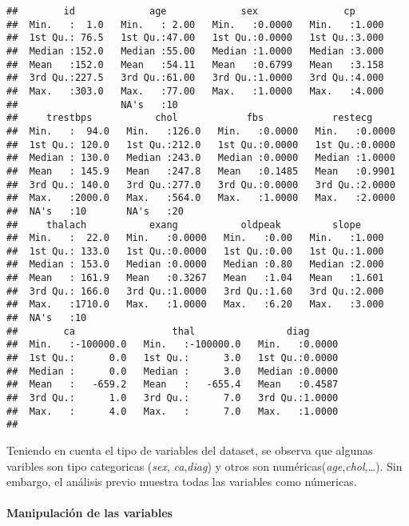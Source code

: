 \documentclass[
]{article}
\begin{document}
\begin{verbatim}
##        id             age             sex               cp       
##  Min.   :  1.0   Min.   : 2.00   Min.   :0.0000   Min.   :1.000  
##  1st Qu.: 76.5   1st Qu.:47.00   1st Qu.:0.0000   1st Qu.:3.000  
##  Median :152.0   Median :55.00   Median :1.0000   Median :3.000  
##  Mean   :152.0   Mean   :54.11   Mean   :0.6799   Mean   :3.158  
##  3rd Qu.:227.5   3rd Qu.:61.00   3rd Qu.:1.0000   3rd Qu.:4.000  
##  Max.   :303.0   Max.   :77.00   Max.   :1.0000   Max.   :4.000  
##                  NA's   :10                                      
##     trestbps           chol            fbs            restecg      
##  Min.   :  94.0   Min.   :126.0   Min.   :0.0000   Min.   :0.0000  
##  1st Qu.: 120.0   1st Qu.:212.0   1st Qu.:0.0000   1st Qu.:0.0000  
##  Median : 130.0   Median :243.0   Median :0.0000   Median :1.0000  
##  Mean   : 145.9   Mean   :247.8   Mean   :0.1485   Mean   :0.9901  
##  3rd Qu.: 140.0   3rd Qu.:277.0   3rd Qu.:0.0000   3rd Qu.:2.0000  
##  Max.   :2000.0   Max.   :564.0   Max.   :1.0000   Max.   :2.0000  
##  NA's   :10       NA's   :20                                       
##     thalach           exang           oldpeak         slope      
##  Min.   :  22.0   Min.   :0.0000   Min.   :0.00   Min.   :1.000  
##  1st Qu.: 133.0   1st Qu.:0.0000   1st Qu.:0.00   1st Qu.:1.000  
##  Median : 153.0   Median :0.0000   Median :0.80   Median :2.000  
##  Mean   : 161.9   Mean   :0.3267   Mean   :1.04   Mean   :1.601  
##  3rd Qu.: 166.0   3rd Qu.:1.0000   3rd Qu.:1.60   3rd Qu.:2.000  
##  Max.   :1710.0   Max.   :1.0000   Max.   :6.20   Max.   :3.000  
##  NA's   :10                                                      
##        ca                 thal                diag       
##  Min.   :-100000.0   Min.   :-100000.0   Min.   :0.0000  
##  1st Qu.:      0.0   1st Qu.:      3.0   1st Qu.:0.0000  
##  Median :      0.0   Median :      3.0   Median :0.0000  
##  Mean   :   -659.2   Mean   :   -655.4   Mean   :0.4587  
##  3rd Qu.:      1.0   3rd Qu.:      7.0   3rd Qu.:1.0000  
##  Max.   :      4.0   Max.   :      7.0   Max.   :1.0000  
## 
\end{verbatim}

Teniendo en cuenta el tipo de variables del dataset, se observa que
algunas varibles son tipo categoricas (\emph{sex},
\emph{ca},\emph{diag}) y otros son
numéricas(\emph{age},\emph{chol},\emph{\ldots{}}). Sin embargo, el
análisis previo muestra todas las variables como númericas.

\hypertarget{manipulaciuxf3n-de-las-variables}{%
\paragraph{Manipulación de las
variables}\label{manipulaciuxf3n-de-las-variables}}
\end{document}
